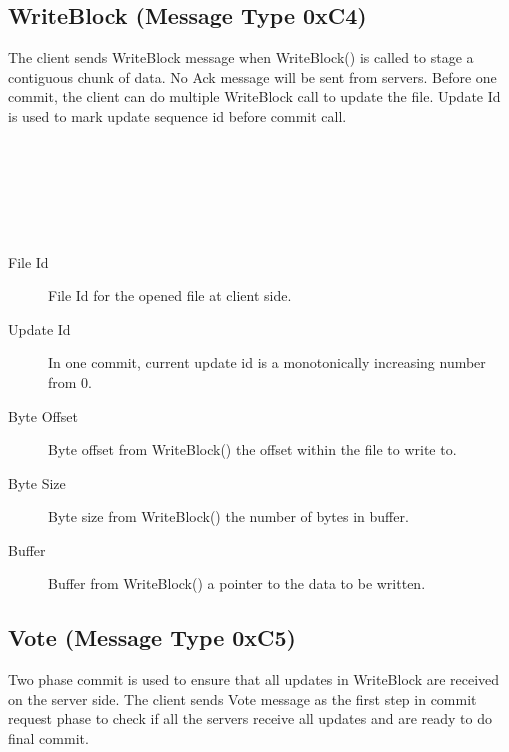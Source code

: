 \documentclass[12pt,fleqn]{article}
\begin{document}
\subsection{WriteBlock (Message Type 0xC4)}
The client sends WriteBlock message when WriteBlock() is called to stage a contiguous chunk of data. No Ack message will be sent from servers. Before one commit, the client can do multiple WriteBlock call to update the file. Update Id is used to mark update sequence id before commit call.

\begin{center}
	\begin{bytefield}[bitwidth=1.1em]{16}
		 \\
		 \\
		 \\
		 \\
		 \\
	\end{bytefield}
\end{center}

\begin{description}
	\item[File Id] File Id for the opened file at client side.
	\item[Update Id] In one commit, current update id is a monotonically increasing number from 0.
	\item[Byte Offset] Byte offset from WriteBlock() the offset within the file to write to.
	\item[Byte Size] Byte size from WriteBlock() the number of bytes in buffer.
	\item[Buffer] Buffer from WriteBlock() a pointer to the data to be written.
\end{description}

\subsection{Vote (Message Type 0xC5)}
Two phase commit is used to ensure that all updates in WriteBlock are received on the server side. 
The client sends Vote message as the first step in commit request phase to check if all the servers receive all updates and are ready to do final commit.
 
\begin{center}
	\begin{bytefield}[bitwidth=1.1em]{16}
		 \\
	\end{bytefield}
\end{center}
\end{document}
